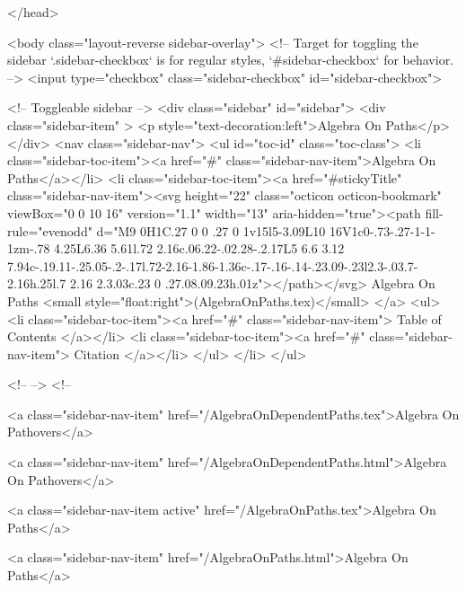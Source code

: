 </head>


  <body class="layout-reverse sidebar-overlay">
    <!-- Target for toggling the sidebar `.sidebar-checkbox` is for regular
     styles, `#sidebar-checkbox` for behavior. -->
<input type="checkbox" class="sidebar-checkbox" id="sidebar-checkbox">

<!-- Toggleable sidebar -->
<div class="sidebar" id="sidebar">
  <div class="sidebar-item" >
    <p style="text-decoration:left">Algebra On Paths</p>
  </div>
  <nav class="sidebar-nav">
    <ul id="toc-id" class="toc-class">
  <li class="sidebar-toc-item"><a href="#" class="sidebar-nav-item">Algebra On Paths</a></li>
  <li class="sidebar-toc-item"><a href="#stickyTitle" class="sidebar-nav-item"><svg height="22" class="octicon octicon-bookmark" viewBox="0 0 10 16" version="1.1" width="13" aria-hidden="true"><path fill-rule="evenodd" d="M9 0H1C.27 0 0 .27 0 1v15l5-3.09L10 16V1c0-.73-.27-1-1-1zm-.78 4.25L6.36 5.61l.72 2.16c.06.22-.02.28-.2.17L5 6.6 3.12 7.94c-.19.11-.25.05-.2-.17l.72-2.16-1.86-1.36c-.17-.16-.14-.23.09-.23l2.3-.03.7-2.16h.25l.7 2.16 2.3.03c.23 0 .27.08.09.23h.01z"></path></svg> Algebra On Paths <small style="float:right">(AlgebraOnPaths.tex)</small>
</a>
    <ul>
      <li class="sidebar-toc-item"><a href="#" class="sidebar-nav-item"> Table of Contents </a></li>
      <li class="sidebar-toc-item"><a href="#" class="sidebar-nav-item"> Citation </a></li>
    </ul>
  </li>
</ul>


    <!--  -->
    <!-- 
      
    
      
    
      
    
      
        
      
    
      
        
          <a class="sidebar-nav-item" href="/AlgebraOnDependentPaths.tex">Algebra On Pathovers</a>
        
      
    
      
        
          <a class="sidebar-nav-item" href="/AlgebraOnDependentPaths.html">Algebra On Pathovers</a>
        
      
    
      
        
          <a class="sidebar-nav-item active" href="/AlgebraOnPaths.tex">Algebra On Paths</a>
        
      
    
      
        
          <a class="sidebar-nav-item" href="/AlgebraOnPaths.html">Algebra On Paths</a>
        
